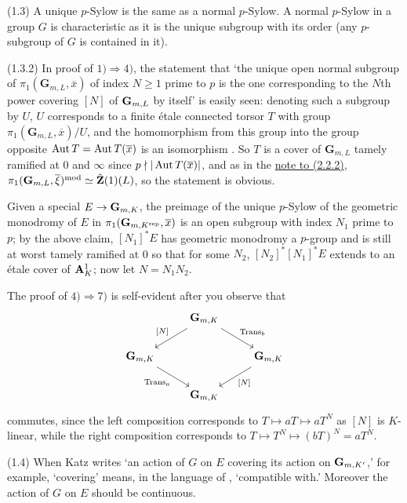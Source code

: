 \documentclass[deligne.tex]{subfiles}
\begin{document}
(1.3) A unique $p$-Sylow is the same as a normal
$p$-Sylow. A normal $p$-Sylow in a group $G$ is characteristic as it is the
unique subgroup with its order (any $p$-subgroup of $G$ is contained in 
it).

(1.3.2) In proof of $1)\Rightarrow 4)$, the statement that `the unique
open normal subgroup of $\pi_1(\mathbf G_{m,L},\overline x)$ of index 
$N\geq1$ prime to $p$ is the one corresponding to the $N$th power covering 
$[N]$ of $\mathbf{G}_{m,L}$ by itself' is easily seen: denoting such a subgroup by
$U$, $U$ corresponds to a finite étale connected torsor $T$ with group
$\pi_1(\mathbf G_{m,L},\overline x)/U$, and the homomorphism from this
group into the group opposite $\operatorname{Aut} T=\operatorname{Aut} T(\overline x)$ is an
isomorphism \cite[5.11]{SGA1}. So $T$ is a cover of $\mathbf G_{m,L}$
tamely ramified at 0 and $\infty$ since $p\nmid {|\operatorname{Aut}T(\overline x)|}$,
and as in the \hyperref[laumon:2.2.2]{note to (2.2.2)},
$\pi_1(\mathbf{G}_{m,L},\overline\xi)^{\mathrm{mod}}\simeq\hat{\mathbf{Z}}(1)(L)$, so the
statement is obvious.

Given a special $E\rightarrow\mathbf{G}_{m,K}$, the preimage of the unique $p$-Sylow of
the geometric monodromy of $E$ in $\pi_1(\mathbf{G}_{m,K^{\mathrm{sep}}},\overline x)$
is an open subgroup with index $N_1$ prime to $p$; by the above claim,
$[N_1]^*E$ has geometric monodromy a $p$-group and is still at worst tamely
ramified at 0 so that for some $N_2$, $[N_2]^*[N_1]^*E$ extends to an étale
cover of $\mathbf{A}^1_K$; now let $N=N_1N_2$.

The proof of $4) \Rightarrow 7)$ is self-evident after you observe that
\begin{equation*}\begin{tikzcd}
	&\GG_{m,K}\arrow[dl,"{[N]}"']\arrow[dr,"\operatorname{Trans}_b"] \\
	\GG_{m,K}\arrow[dr,"\operatorname{Trans}_a"']&&\GG_{m,K}\arrow[dl,"{[N]}"] \\
	&\GG_{m,K}
\end{tikzcd}\end{equation*}
commutes, since the left composition corresponds to
$T\mapsto aT\mapsto aT^N$ as $[N]$ is $K$-linear, while the right 
composition corresponds to $T\mapsto T^N\mapsto (bT)^N=aT^N$.

(1.4) When Katz writes `an action of $G$ on $E$ covering its action on
$\mathbf{G}_{m,K'}$,' for example, `covering' means, in the language of
\cite[XIII 1.1]{SGA7}, `compatible with.' Moreover the action of $G$ on $E$ 
should be continuous.
\end{document}
